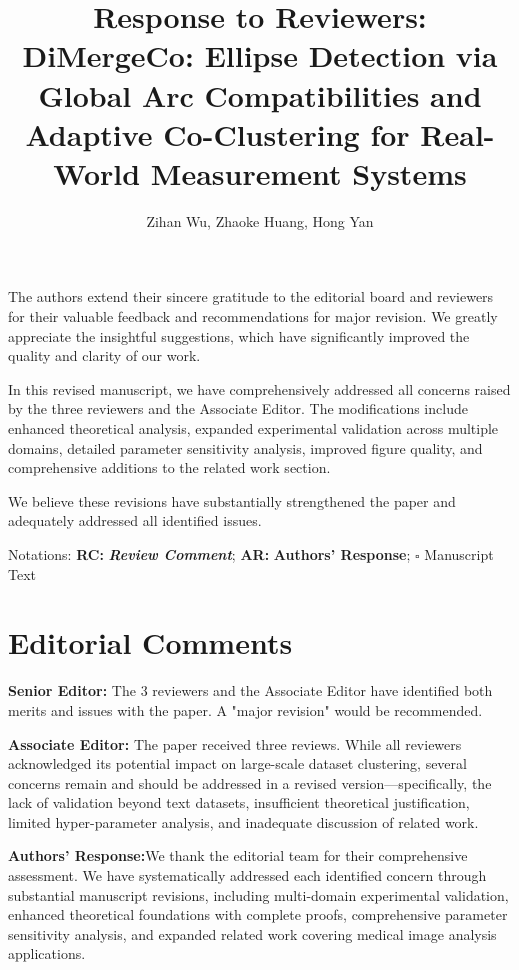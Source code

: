 \documentclass{ar2rc}
\title{Response to Reviewers:\\
DiMergeCo: Ellipse Detection via Global Arc Compatibilities and Adaptive Co-Clustering for Real-World Measurement Systems}
\author{Zihan Wu, Zhaoke Huang, Hong Yan}
\renewcommand{\AR}{\textbf{Authors' Response:}}
\begin{document}
\maketitle

\noindent
The authors extend their sincere gratitude to the editorial board and reviewers for their valuable feedback and recommendations for major revision. We greatly appreciate the insightful suggestions, which have significantly improved the quality and clarity of our work.

In this revised manuscript, we have comprehensively addressed all concerns raised by the three reviewers and the Associate Editor. The modifications include enhanced theoretical analysis, expanded experimental validation across multiple domains, detailed parameter sensitivity analysis, improved figure quality, and comprehensive additions to the related work section.

We believe these revisions have substantially strengthened the paper and adequately addressed all identified issues.

Notations: \textbf{RC:} \textbf{\textit{Review Comment}}; \textbf{AR:} \textbf{Authors' Response}; $\square$ Manuscript Text


\section{Editorial Comments}

\textbf{Senior Editor:} The 3 reviewers and the Associate Editor have identified both merits and issues with the paper. A "major revision" would be recommended.

\textbf{Associate Editor:} The paper received three reviews. While all reviewers acknowledged its potential impact on large-scale dataset clustering, several concerns remain and should be addressed in a revised version—specifically, the lack of validation beyond text datasets, insufficient theoretical justification, limited hyper-parameter analysis, and inadequate discussion of related work.

\AR We thank the editorial team for their comprehensive assessment. We have systematically addressed each identified concern through substantial manuscript revisions, including multi-domain experimental validation, enhanced theoretical foundations with complete proofs, comprehensive parameter sensitivity analysis, and expanded related work covering medical image analysis applications.
\end{document}

